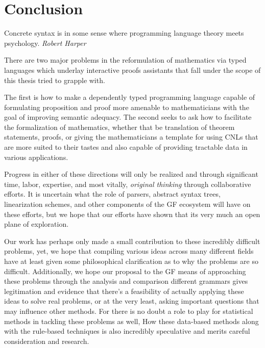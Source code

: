 \section{Conclusion}

\begin{displayquote}
Concrete syntax is in some sense where programming language theory meets
psychology. \emph{Robert Harper} 
\end{displayquote}


There are two major problems in the reformulation of mathematics via
typed languages which underlay interactive proofs assistants that fall under the
scope of this thesis tried to grapple with. 

The first is how to make a dependently typed programming language capable of
formulating proposition and proof more amenable to mathematicians with the goal
of improving semantic adequacy. The second seeks to ask how to facilitate the
formalization of mathematics, whether that be translation of theorem statements,
proofs, or giving the mathematicians a template for using CNLs that are more
suited to their tastes and also capable of providing tractable data in various
applications.

Progress in either of these directions will only be realized and through
significant time, labor, expertise, and most vitally, \emph{original thinking}
through collaborative efforts. It is uncertain what the role of parsers,
abstract syntax trees, linearization schemes, and other components of the GF
ecosystem will have on these efforts, but we hope that our efforts have shown
that its very much an open plane of exploration. 

Our work has perhaps only made a small contribution to these incredibly
difficult problems, yet, we hope that compiling various ideas across many
different fields have at least given some philosophical clarification as to why
the problems are so difficult. Additionally, we hope our proposal to the GF
means of approaching these problems through the analysis and comparison
different grammars gives legitimation and evidence that there's a feasibility of
actually applying these ideas to solve real problems, or at the very least,
asking important questions that may influence other methods. For there is no
doubt a role to play for statistical methods in tackling these problems as well,
How these data-based methods along with the rule-based techniques is
also incredibly speculative and merits careful consideration and research.

